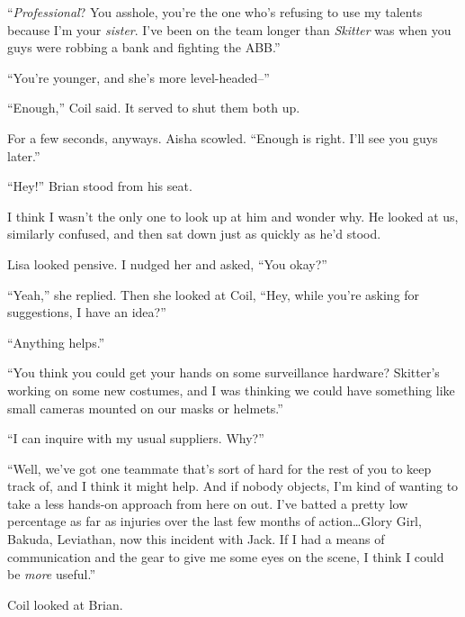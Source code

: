 ``\emph{Professional}?  You asshole, you're the one who's refusing to use my talents because I'm your \emph{sister}.  I've been on the team longer than \emph{Skitter} was when you guys were robbing a bank and fighting the ABB.''



``You're younger, and she's more level-headed--''



``Enough,'' Coil said.  It served to shut them both up.



For a few seconds, anyways.  Aisha scowled.  ``Enough is right.  I'll see you guys later.''



``Hey!''  Brian stood from his seat.



I think I wasn't the only one to look up at him and wonder why.  He looked at us, similarly confused, and then sat down just as quickly as he'd stood.



Lisa looked pensive.  I nudged her and asked, ``You okay?''



``Yeah,'' she replied.  Then she looked at Coil, ``Hey, while you're asking for suggestions, I have an idea?''



``Anything helps.''



``You think you could get your hands on some surveillance hardware?  Skitter's working on some new costumes, and I was thinking we could have something like small cameras mounted on our masks or helmets.''



``I can inquire with my usual suppliers.  Why?''



``Well, we've got one teammate that's sort of hard for the rest of you to keep track of, and I think it might help.  And if nobody objects, I'm kind of wanting to take a less hands-on approach from here on out.  I've batted a pretty low percentage as far as injuries over the last few months of action\ldots Glory Girl, Bakuda, Leviathan, now this incident with Jack.  If I had a means of communication and the gear to give me some eyes on the scene, I think I could be \emph{more} useful.''



Coil looked at Brian.



